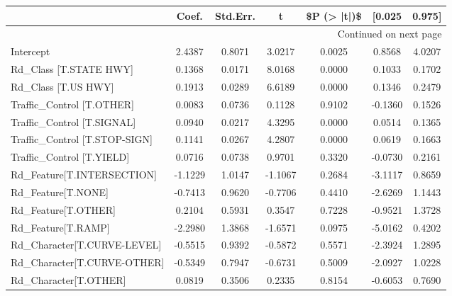 \begin{longtable}{p{4cm}cccccc}
\toprule
{} &   Coef. &  Std.Err. &       t &  \$P (> |t|)\$ &  [0.025 &  0.975] \\
\midrule
\endhead
\midrule
\multicolumn{7}{r}{{Continued on next page}} \\
\midrule
\endfoot

\bottomrule
\endlastfoot
Intercept                                          &  2.4387 &    0.8071 &  3.0217 &       0.0025 &  0.8568 &  4.0207 \\
Rd\_Class [T.STATE HWY]                             &  0.1368 &    0.0171 &  8.0168 &       0.0000 &  0.1033 &  0.1702 \\
Rd\_Class [T.US HWY]                                &  0.1913 &    0.0289 &  6.6189 &       0.0000 &  0.1346 &  0.2479 \\
Traffic\_Control [T.OTHER]                          &  0.0083 &    0.0736 &  0.1128 &       0.9102 & -0.1360 &  0.1526 \\
Traffic\_Control [T.SIGNAL]                         &  0.0940 &    0.0217 &  4.3295 &       0.0000 &  0.0514 &  0.1365 \\
Traffic\_Control [T.STOP-SIGN]                      &  0.1141 &    0.0267 &  4.2807 &       0.0000 &  0.0619 &  0.1663 \\
Traffic\_Control [T.YIELD]                          &  0.0716 &    0.0738 &  0.9701 &       0.3320 & -0.0730 &  0.2161 \\
Rd\_Feature[T.INTERSECTION]                         & -1.1229 &    1.0147 & -1.1067 &       0.2684 & -3.1117 &  0.8659 \\
Rd\_Feature[T.NONE]                                 & -0.7413 &    0.9620 & -0.7706 &       0.4410 & -2.6269 &  1.1443 \\
Rd\_Feature[T.OTHER]                                &  0.2104 &    0.5931 &  0.3547 &       0.7228 & -0.9521 &  1.3728 \\
Rd\_Feature[T.RAMP]                                 & -2.2980 &    1.3868 & -1.6571 &       0.0975 & -5.0162 &  0.4202 \\
Rd\_Character[T.CURVE-LEVEL]                        & -0.5515 &    0.9392 & -0.5872 &       0.5571 & -2.3924 &  1.2895 \\
Rd\_Character[T.CURVE-OTHER]                        & -0.5349 &    0.7947 & -0.6731 &       0.5009 & -2.0927 &  1.0228 \\
Rd\_Character[T.OTHER]                              &  0.0819 &    0.3506 &  0.2335 &       0.8154 & -0.6053 &  0.7690 \\

\end{longtable}
